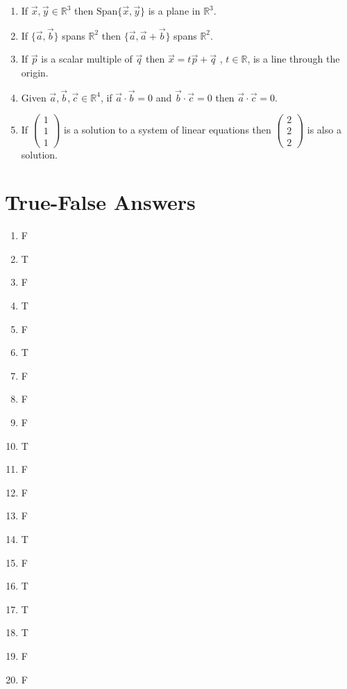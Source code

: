 \documentclass[12pt]{book}
\begin{document}
\begin{enumerate}
\begin{enumerate}
\item If $\vec{x}, \vec{y} \in \mathbb{R}^3$ then $\textrm{Span}\{ \vec{x}, \vec{y}\}$ is a plane in $\mathbb{R}^3$.
\item If $\{ \vec{a}, \vec{b} \}$ spans $\mathbb{R}^2$ then $\{ \vec{a}, \vec{a}+\vec{b} \}$ spans $\mathbb{R}^2$.
\item If $\vec{p}$ is a scalar multiple of $\vec{q}$ then $\vec{x} = t \vec{p} + \vec{q}$ , $t \in \mathbb{R}$, is a line through the origin.
\item Given $\vec{a}, \vec{b}, \vec{c} \in \mathbb{R}^4$, if $\vec{a} \cdot \vec{b} = 0$ and $\vec{b} \cdot \vec{c} = 0$ then $\vec{a} \cdot \vec{c} = 0$. 
\item If $\left(\begin{smallmatrix} 1 \\ 1 \\ 1 \end{smallmatrix}\right)$ is a solution to a system of linear equations then $\left(\begin{smallmatrix} 2 \\ 2 \\ 2 \end{smallmatrix}\right)$ is also a solution. 
\end{enumerate}

\newpage

\section*{True-False Answers}

\begin{enumerate}
\item F
\item T
\item F
\item T
\item F
\item T
\item F
\item F
\item F
\item T
\item F
\item F
\item F
\item T
\item F
\item T
\item T
\item T
\item F
\item F
\end{enumerate}


\end{enumerate}
\end{document}
